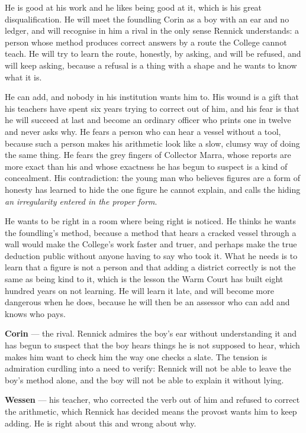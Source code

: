 \documentclass{design/chronicle}
\begin{document}
{He is good at his work and he likes being good at it, which is his great disqualification. He will meet the foundling Corin as a boy with an ear and no ledger, and will recognise in him a rival in the only sense Rennick understands: a person whose method produces correct answers by a route the College cannot teach. He will try to learn the route, honestly, by asking, and will be refused, and will keep asking, because a refusal is a thing with a shape and he wants to know what it is.

He can add, and nobody in his institution wants him to. His wound is a gift that his teachers have spent six years trying to correct out of him, and his fear is that he will succeed at last and become an ordinary officer who prints one in twelve and never asks why. He fears a person who can hear a vessel without a tool, because such a person makes his arithmetic look like a slow, clumsy way of doing the same thing. He fears the grey fingers of Collector Marra, whose reports are more exact than his and whose exactness he has begun to suspect is a kind of concealment. His contradiction: the young man who believes figures are a form of honesty has learned to hide the one figure he cannot explain, and calls the hiding \emph{an irregularity entered in the proper form}.

He wants to be right in a room where being right is noticed. He thinks he wants the foundling’s method, because a method that hears a cracked vessel through a wall would make the College’s work faster and truer, and perhaps make the true deduction public without anyone having to say who took it. What he needs is to learn that a figure is not a person and that adding a district correctly is not the same as being kind to it, which is the lesson the Warm Court has built eight hundred years on not learning. He will learn it late, and will become more dangerous when he does, because he will then be an assessor who can add and knows who pays.

\textbf{Corin} — the rival. Rennick admires the boy’s ear without understanding it and has begun to suspect that the boy hears things he is not supposed to hear, which makes him want to check him the way one checks a slate. The tension is admiration curdling into a need to verify: Rennick will not be able to leave the boy’s method alone, and the boy will not be able to explain it without lying.

\textbf{Wessen} — his teacher, who corrected the verb out of him and refused to correct the arithmetic, which Rennick has decided means the provost wants him to keep adding. He is right about this and wrong about why.

}
\end{document}
